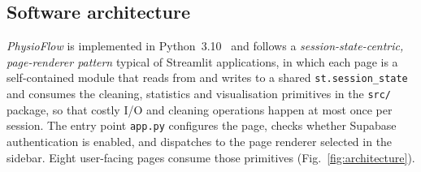 \documentclass[preprint,12pt,a4paper]{elsarticle}
\begin{document}
\subsection{Software architecture}\label{sec:arch}

\emph{PhysioFlow} is implemented in Python~3.10~\cite{Streamlit,McKinney2010,Harris2020} and follows a \emph{session-state-centric, page-renderer pattern} typical of Streamlit applications, in which each page is a self-contained module that reads from and writes to a shared \texttt{st.session\_state} and consumes the cleaning, statistics and visualisation primitives in the \texttt{src/} package, so that costly I/O and cleaning operations happen at most once per session. The entry point \texttt{app.py} configures the page, checks whether Supabase authentication is enabled, and dispatches to the page renderer selected in the sidebar. Eight user-facing pages consume those primitives (Fig.~\ref{fig:architecture}).
\end{document}
